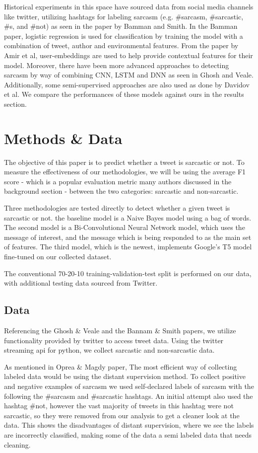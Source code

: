 \documentclass[11pt,a4paper]{article}
\begin{document}
Historical experiments in this space have sourced data from social media channels like twitter, utilizing hashtags for labeling sarcasm (e.g. \#sarcasm, \#sarcastic, \#s, and \#not) as seen in the paper by Bamman and Smith. In the Bamman paper, logistic regression is used for classification by training the model with a combination of tweet, author and environmental features. From the paper by Amir et al, user-embeddings are used to help provide contextual features for their model.  Moreover, there have been more advanced approaches to detecting sarcasm by way of combining CNN, LSTM and DNN as seen in Ghosh and Veale. Additionally, some semi-supervised approaches are also used as done by Davidov et al. We compare the performances of these models against ours in the results section.

\section{Methods \& Data}
The objective of this paper is to predict whether a tweet is sarcastic or not. To measure the effectiveness of our methodologies, we will be using the average F1 score - which is a popular evaluation metric many authors discussed in the background section - between the two categories: sarcastic and non-sarcastic. 

Three methodologies are tested directly to detect whether a given tweet is sarcastic or not. the baseline model is a Naive Bayes model using a bag of words. The second model is a Bi-Convolutional Neural Network model, which uses the message of interest, and the message which is being responded to as the main set of features. The third model, which is the newest, implements Google's T5 model fine-tuned on our collected dataset.

The conventional 70-20-10 training-validation-test split is performed on our data, with additional testing data sourced from Twitter. 

\subsection{Data}
Referencing the Ghosh \& Veale and the Bannam \& Smith papers, we utilize functionality provided by twitter to access tweet data. Using the twitter streaming api for python, we collect sarcastic and non-sarcastic data.

As mentioned in Oprea \& Magdy paper, The most efficient way of collecting labeled data would be using the distant supervision method. To collect positive and negative examples of sarcasm we used self-declared labels of sarcasm with the following the \#sarcasm and \#sarcastic hashtags. An initial attempt also used the hashtag \#not, however the vast majority of tweets in this hashtag were not sarcastic, so they were removed from our analysis to get a cleaner look at the data. This shows the disadvantages of distant supervision, where we see the labels are incorrectly classified, making some of the data a semi labeled data that needs cleaning.
\end{document}
